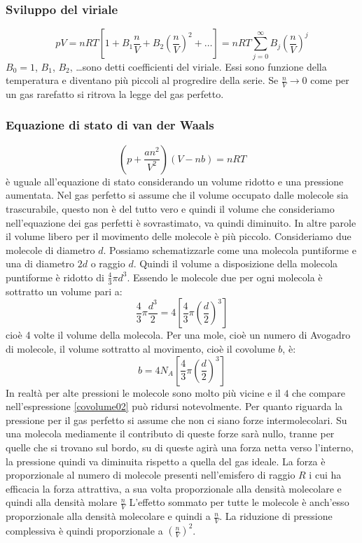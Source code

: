\subsubsection{Sviluppo del viriale}
\begin{equation}
pV=nRT\left[1+B_1\frac{n}{V}+B_2\left(\frac{n}{V}\right)^2+\ldots\right]=nRT\sum_{j=0}^\infty B_j\left(\frac{n}{V}\right)^j
\end{equation}
$B_0=1$, $B_1$, $B_2$, \ldots sono detti coefficienti del viriale. Essi sono funzione della temperatura e diventano più piccoli al progredire della serie. Se $\frac{n}{V}\to 0$ come per un gas rarefatto si ritrova la legge del gas perfetto.
\subsubsection{Equazione di stato di van der Waals}
\begin{equation}
\left(p+\frac{an^2}{V^2}\right)(V-nb)=nRT
\end{equation}
è uguale all'equazione di stato considerando un volume ridotto e una pressione aumentata. Nel gas perfetto si assume che il volume occupato dalle molecole sia trascurabile, questo non è del tutto vero e quindi il volume che consideriamo nell'equazione dei gas perfetti è sovrastimato, va quindi diminuito. In altre parole il volume libero per il movimento delle molecole è più piccolo. Consideriamo due molecole di diametro $d$. Possiamo schematizzarle come una molecola puntiforme e una di diametro $2d$ o raggio $d$. Quindi il volume a disposizione della molecola puntiforme è ridotto di $\frac{4}{3}\pi d^3$. Essendo le molecole due per ogni molecola è sottratto un volume pari a:
\begin{equation}
\frac{4}{3}\pi\frac{d^3}{2}=4\left[\frac{4}{3}\pi\left(\frac{d}{2}\right)^3\right]
\end{equation}
cioè 4 volte il volume della molecola. Per una mole, cioè un numero di Avogadro di molecole, il volume sottratto al movimento, cioè il covolume $b$, è:
\begin{equation}
b=4N_A\left[\frac{4}{3}\pi\left(\frac{d}{2}\right)^3\right]
\label{covolume02}
\end{equation}
In realtà per alte pressioni le molecole sono molto più vicine e il $4$ che compare nell'espressione \eqref{covolume02} può ridursi notevolmente.
 Per quanto riguarda la pressione per il gas perfetto si assume che non ci siano forze intermolecolari. Su una molecola mediamente il contributo di queste forze sarà nullo, tranne per quelle che si trovano sul bordo, su di queste agirà una forza netta verso l'interno, la pressione quindi va diminuita rispetto a quella del gas ideale. La forza è proporzionale al numero di molecole presenti nell'emisfero di raggio $R$ i cui ha efficacia la forza attrattiva, a sua volta proporzionale alla densità molecolare e quindi alla densità molare $\frac{n}{V}$ L'effetto sommato per tutte le molecole è anch'esso proporzionale alla densità molecolare e quindi a $\frac{n}{V}$. La riduzione di pressione complessiva è quindi proporzionale a $\left(\frac{n}{V}\right)^2$.
